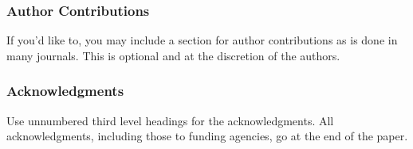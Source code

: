 \documentclass{article} %
\begin{document}
\subsubsection*{Author Contributions}
If you'd like to, you may include  a section for author contributions as is done
in many journals. This is optional and at the discretion of the authors.

\subsubsection*{Acknowledgments}
Use unnumbered third level headings for the acknowledgments. All
acknowledgments, including those to funding agencies, go at the end of the paper.

\label{last_page}



\end{document}

